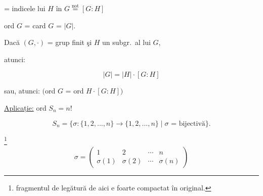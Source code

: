 \documentclass[12pt]{article}
\begin{document}
\noindent = indicele lui $H$ în $G \overset{\text{not}}{=} [G:H]$

\noindent ord $G$ = card $G$ = $|G|$.

\bigskip
\noindent{} \quad Dacă $(G,\cdot)$ = grup finit şi $H$ un subgr.\ al lui $G$,

\noindent atunci:

\[
\boxed{|G| = |H|\cdot [G:H]}
\]

\noindent sau, atunci: \quad $\big($ord $G$ = ord $H\cdot [G:H]\big)$

\bigskip
\noindent\underline{Aplicație:} ord $S_n = n!$

\[
S_n = \{\sigma : \{1,2,\ldots,n\}\to\{1,2,\ldots,n\} \mid \sigma \text{ = bijectivă}\}.
\]

\noindent [Notăm:]\footnote{fragmentul de legătură de aici e foarte compactat în original.}
\[
\sigma = \begin{pmatrix} 1 & 2 & \cdots & n \\ \sigma(1) & \sigma(2) & \cdots & \sigma(n) \end{pmatrix}
\]
\end{document}

